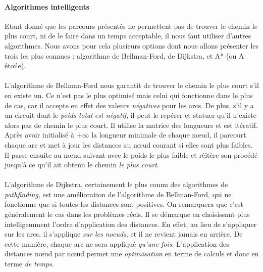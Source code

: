\paragraph{Algorithmes intelligents} Etant donné que les parcours présentés ne permettent pas de trouver le chemin
le plus court, ni de le faire dans un temps acceptable, il nous faut utiliser d'autres algorithmes. Nous avons pour
cela plusieurs options dont nous allons présenter les trois les plus connues : algorithme de Bellman-Ford, de Dijkstra,
et A* (ou A étoile).

\paragraph{} L'algorithme de Bellman-Ford nous garantit de trouver le chemin le plus court s'il en existe un. Ce n'est pas
le plus optimisé mais celui qui fonctionne dans le plus de cas, car il accepte en effet des valeurs \emph{négatives} pour les
arcs. De plus, s'il y a un circuit dont le \emph{poids total est négatif}, il peut le repérer et statuer qu'il n'existe alors
pas de chemin le plus court. Il utilise la matrice des longueurs et est itératif. Après avoir initialisé à $+\infty$ la 
longueur minimale de chaque n\oe{}ud, il parcourt chaque arc et met à jour les distances au n\oe{}ud courant si elles sont
plus faibles. Il passe ensuite au n\oe{}ud suivant avec le poids le plus faible et réitère son procédé jusqu'à ce qu'il ait
obtenu le chemin \emph{le plus court}.

\paragraph{} L'algorithme de Dijkstra, certainement le plus connu des algorithmes de \emph{pathfinding}, est une amélioration
de l'algorithme de Bellman-Ford, qui ne fonctionne que si toutes les distances sont positives. On remarquera que c'est généralement
le cas dans les problèmes réels. Il se démarque en choisissant plus intelligemment l'ordre d'application des distances. En effet,
au lieu de s'appliquer sur les arcs, il s'applique \emph{sur les noeuds}, et il ne revient jamais en arrière. De cette manière,
chaque arc ne sera appliqué \emph{qu'une fois}. L'application des distances n\oe{}ud par n\oe{}ud permet une \emph{
optimisation} en terme de calculs et donc en terme \emph{de temps}.

